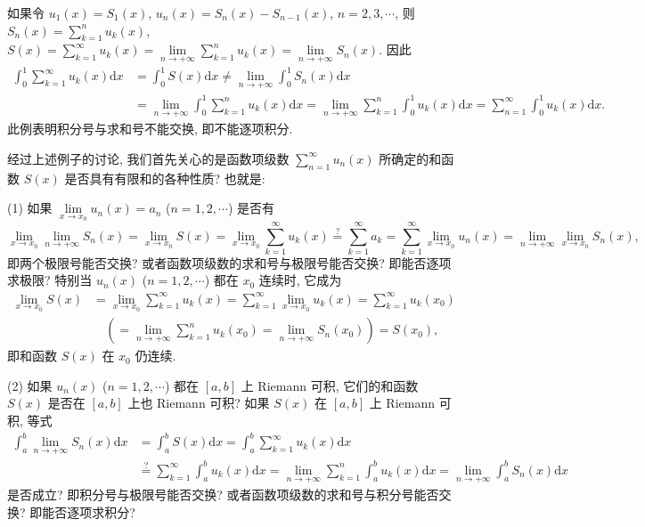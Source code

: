 如果令 $u_{1}(x)=S_{1}(x)$, $u_{n}(x)=S_{n}(x)-S_{n-1}(x)$, $n=2,3,\cdots$, 则 $S_{n}(x)=\sum_{k=1}^{n}u_{k}(x)$, $S(x)=\sum_{k=1}^{\infty}u_{k}(x)=\lim\limits_{n\to+\infty}\sum_{k=1}^{n}u_{k}(x)=\lim\limits_{n\to+\infty}S_{n}(x)$. 因此
\[
  \begin{aligned}
    \int_{0}^{1}\sum_{k=1}^{\infty}u_{k}(x)\mathrm{d}x&=\int_{0}^{1}S(x)\mathrm{d}x\neq\lim_{n\to+\infty}\int_{0}^{1}S_{n}(x)\mathrm{d}x\\
    &=\lim_{n\to+\infty}\int_{0}^{1}\sum_{k=1}^{n}u_{k}(x)\mathrm{d}x=\lim_{n\to+\infty}\sum_{k=1}^{n}\int_{0}^{1}u_{k}(x)\mathrm{d}x=\sum_{n=1}^{\infty}\int_{0}^{1}u_{k}(x)\mathrm{d}x.
  \end{aligned}
\]
此例表明积分号与求和号不能交换, 即不能逐项积分.

经过上述例子的讨论, 我们首先关心的是函数项级数 $\sum_{n=1}^{\infty}u_{n}(x)$ 所确定的和函数 $S(x)$ 是否具有有限和的各种性质? 也就是:

(1) 如果 $\lim\limits_{x\to x_{0}}u_{n}(x)=a_{n}$ ($n=1,2,\cdots$) 是否有
\[
  \lim_{x\to x_{0}}\lim_{n\to+\infty}S_{n}(x)=\lim_{x\to x_{0}}S(x)=\lim_{x\to x_{0}}\sum_{k=1}^{\infty}u_{k}(x)\overset{?}{=}\sum_{k=1}^{\infty}a_{k}=\sum_{k=1}^{\infty}\lim_{x\to x_{0}}u_{n}(x)=\lim_{n\to+\infty}\lim_{x\to x_{0}}S_{n}(x),
\]
即两个极限号能否交换? 或者函数项级数的求和号与极限号能否交换? 即能否逐项求极限? 特别当 $u_{n}(x)$ ($n=1,2,\cdots$) 都在 $x_{0}$ 连续时, 它成为
\[
  \begin{aligned}
    \lim_{x\to x_{0}}S(x)&=\lim_{x\to x_{0}}\sum_{k=1}^{\infty}u_{k}(x)=\sum_{k=1}^{\infty}\lim_{x\to x_{0}}u_{k}(x)=\sum_{k=1}^{\infty}u_{k}(x_{0})\\
    &\quad\left(=\lim_{n\to+\infty}\sum_{k=1}^{n}u_{k}(x_{0})=\lim_{n\to+\infty}S_{n}(x_{0})\right)=S(x_{0}),
  \end{aligned}
\]
即和函数 $S(x)$ 在 $x_{0}$ 仍连续.

(2) 如果 $u_{n}(x)$ ($n=1,2,\cdots$) 都在 $[a,b]$ 上 Riemann 可积, 它们的和函数 $S(x)$ 是否在 $[a,b]$ 上也 Riemann 可积? 如果 $S(x)$ 在 $[a,b]$ 上 Riemann 可积, 等式
\[
  \begin{aligned}
    \int_{a}^{b}\lim_{n\to+\infty}S_{n}(x)\mathrm{d}x&=\int_{a}^{b}S(x)\mathrm{d}x=\int_{a}^{b}\sum_{k=1}^{\infty}u_{k}(x)\mathrm{d}x\\
    &\overset{?}{=}\sum_{k=1}^{\infty}\int_{a}^{b}u_{k}(x)\mathrm{d}x=\lim_{n\to+\infty}\sum_{k=1}^{n}\int_{a}^{b}u_{k}(x)\mathrm{d}x=\lim_{n\to+\infty}\int_{a}^{b}S_{n}(x)\mathrm{d}x
  \end{aligned}
\]
是否成立? 即积分号与极限号能否交换? 或者函数项级数的求和号与积分号能否交换? 即能否逐项求积分?

